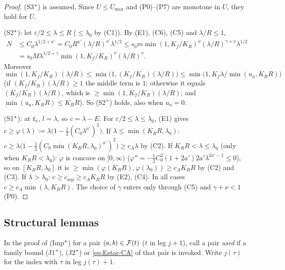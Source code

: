 \begin{proof}
(S3$^{*}$) is assumed. Since $U\le U_{\max}$ and \textup{(P0)}--\textup{(P7)} are monotone in $U$, they hold for $U$.

(S2$^{*}$): let $\varepsilon/2\le\lambda\le R$ ($\le\lambda_0$ by (C1)). By (E1), (C6), (C5) and $\lambda/R\le1$,
\begin{align*}
N&\le C_0\lambda^{1/2+a'}=C_0R^{a'}(\lambda/R)^{a'}\lambda^{1/2}\le s_0m\min(1,K_f/K_R)^\nu(\lambda/R)^{\gamma+\nu}\lambda^{1/2}\\
&=s_0M\lambda^{1/2+\gamma}\min(1,K_f/K_R)^\nu(\lambda/R)^\nu .
\end{align*}
Moreover
\[
\min(1,K_f/K_R)\,(\lambda/R)\le\min\bigl(1,(K_f/K_R)(\lambda/R)\bigr)\le\min\bigl(1,K_f\lambda/\min(u_a,K_RR)\bigr)
\]
(if $(K_f/K_R)(\lambda/R)\ge1$ the middle term is $1$; otherwise it equals $(K_f/K_R)(\lambda/R)$, which is
$\ge\min(1,K_f/K_R)(\lambda/R)$; and $\min(u_a,K_RR)\le K_RR$). So (S2$^{*}$) holds, also when $u_a=0$.

(S1$^{*}$): at $t_{\mathrm s}$, $l=\lambda$, so $c=\lambda-E$. For $\varepsilon/2\le\lambda\le\lambda_0$, (E1) gives
$c\ge\varphi(\lambda):=\lambda\bigl(1-\frac12(C_0\lambda^{a'})^2\bigr)$.
If $\lambda\le\min(K_RR,\lambda_0)$: $c\ge\lambda\bigl(1-\frac12(C_0\min(K_RR,\lambda_0)^{a'})^2\bigr)\ge c_A\lambda$ by (C2).
If $K_RR<\lambda\le\lambda_0$ (only when $K_RR<\lambda_0$): $\varphi$ is concave on $[0,\infty)$
($\varphi''=-\frac12C_0^2(1+2a')2a'\lambda^{2a'-1}\le0$), so on $[K_RR,\lambda_0]$ it is $\ge\min(\varphi(K_RR),\varphi(\lambda_0))\ge
c_AK_RR$ by (C2) and (C3).
If $\lambda>\lambda_0$: $c\ge c_{\mathrm{sep}}\ge c_AK_RR$ by (E2), (C4).
In all cases $c\ge c_A\min(\lambda,K_RR)$. The choice of $\gamma$ enters only through (C5) and $\gamma+\nu<1$ \textup{(P0)}.
\end{proof}

\subsection{Structural lemmas}

In the proof of (Imp$^{*}$) for a pair $(a,b)\in\mathcal F(t)$ ($t$ in leg $j+1$), call a pair \emph{used} if a family bound (J1$^{*}$),
(J2$^{*}$) or \eqref{eq:Estar-CA} of that pair is invoked. Write $j(\tau)$ for the index with $\tau$ in leg $j(\tau)+1$.

